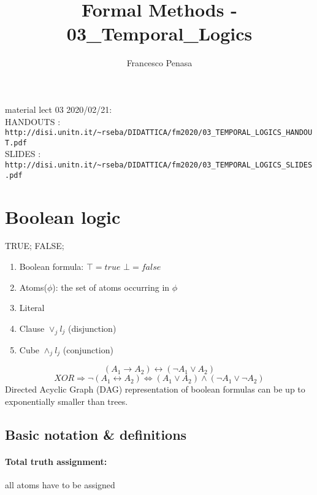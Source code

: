 \documentclass[11pt]{article}
\begin{document}
\author{Francesco Penasa}
\title{Formal Methods - 03\_Temporal\_Logics}
\maketitle

\medskip

material lect 03 2020/02/21: 
\\
HANDOUTS : \texttt{http://disi.unitn.it/\~{}rseba/DIDATTICA/fm2020/03\_TEMPORAL\_LOGICS\_HANDOUT.pdf}
\\
SLIDES : \texttt{http://disi.unitn.it/\~{}rseba/DIDATTICA/fm2020/03\_TEMPORAL\_LOGICS\_SLIDES.pdf}
\\
\section{Boolean logic} %
\label{sec:boolean_logic}
TRUE; FALSE;
\begin{enumerate}
	\item Boolean formula: $\top = true$  $\bot = false$
	\item Atoms($\phi$): the set of atoms occurring in $\phi$
	\item Literal
	\item Clause $\lor _j l_j$ (disjunction)
	\item Cube $\land _j l_j$ (conjunction)
\end{enumerate}
\[
	(A_1 \rightarrow A_2) \leftrightarrow (\lnot A_1 \lor A_2)
\]
\[
	XOR \Rightarrow \lnot(A_1 \leftrightarrow A_2) \Leftrightarrow (A_1 \lor A_2) \land (\lnot A_1 \lor \lnot A_2)
\]
Directed Acyclic Graph (DAG) representation of boolean formulas can be up to exponentially smaller than trees.

\subsection{Basic notation \& definitions} %
\label{sub:basic_notation_&_definitions}

\paragraph{Total truth assignment:} %
\label{par:total_truth_assignment}
all atoms have to be assigned
\end{document}
